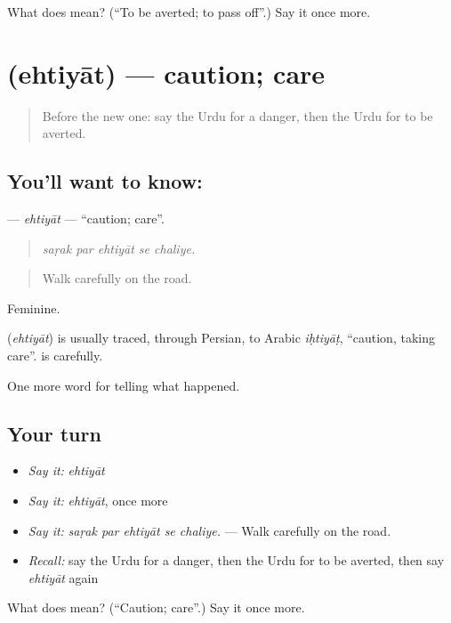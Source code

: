 \begin{tcolorbox}[breakable,colback=teal!4,colframe=teal!35!black,title={Before you move on}]
What does  mean? (\textquotedblleft{}To be averted; to pass off\textquotedblright{}.) Say it once more.
\end{tcolorbox}
\section[\texorpdfstring{\ur{احتیاط} (ehtiyāt)}{احتیاط (ehtiyāt)}]{ (ehtiyāt) — caution; care}

\label{lesson:UR-C290-ehtiyat}



\begin{quote}
Before the new one: say the Urdu for a danger, then the Urdu for to be averted.
\end{quote}

\subsection*{You'll want to know: }
\textbf{} — \emph{ehtiyāt} — \textquotedblleft{}caution; care\textquotedblright{}.

\begin{quote}
    
\end{quote}

\begin{quote}
\emph{saṛak par ehtiyāt se chaliye.}
\end{quote}

\begin{quote}
Walk carefully on the road.
\end{quote}

Feminine.

\begin{cousinweb}
\textbf{} (\emph{ehtiyāt}) is usually traced, through Persian, to Arabic \emph{iḥtiyāṭ}, \textquotedblleft{}caution, taking care\textquotedblright{}. \textbf{ } is carefully.
\end{cousinweb}

\begin{grammarlens}[title={What you've built}]
One more word for telling what happened.
\end{grammarlens}

\subsection*{Your turn}
\begin{itemize}
\raggedright
  \item \emph{Say it:} \emph{ehtiyāt}
  \item \emph{Say it:} \emph{ehtiyāt}, once more
  \item \emph{Say it:} \emph{saṛak par ehtiyāt se chaliye.} — Walk carefully on the road.
  \item \emph{Recall:} say the Urdu for a danger, then the Urdu for to be averted, then say \emph{ehtiyāt} again
\end{itemize}

\begin{tcolorbox}[breakable,colback=teal!4,colframe=teal!35!black,title={Before you move on}]
What does  mean? (\textquotedblleft{}Caution; care\textquotedblright{}.) Say it once more.
\end{tcolorbox}
